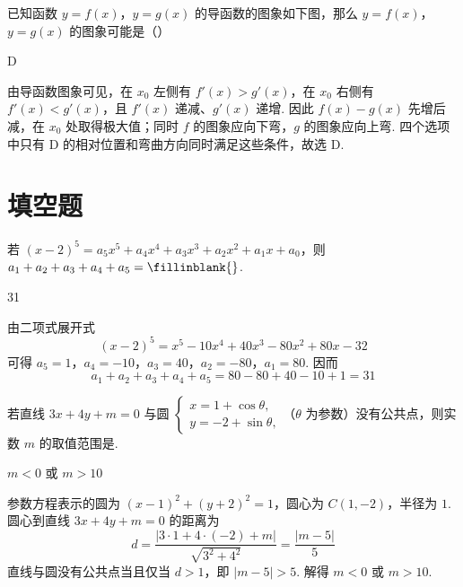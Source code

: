\begin{problem}
已知函数 \( y = f(x) \)，\( y = g(x) \) 的导函数的图象如下图，那么 \( y = f(x) \)，\( y = g(x) \) 的图象可能是（\quad）


    {}
    {}
    {}
\begin{answer}
D
\end{answer}
\begin{solution}
由导函数图象可见，在 \(x_0\) 左侧有 \(f'(x)>g'(x)\)，在 \(x_0\) 右侧有 \(f'(x)<g'(x)\)，且 \(f'(x)\) 递减、\(g'(x)\) 递增. 因此 \(f(x)-g(x)\) 先增后减，在 \(x_0\) 处取得极大值；同时 \(f\) 的图象应向下弯，\(g\) 的图象应向上弯. 四个选项中只有 D 的相对位置和弯曲方向同时满足这些条件，故选 D.
\end{solution}
\end{problem}

\section{填空题}

\begin{problem}
若 \((x - 2)^{5} = a_{5}x^{5} + a_{4}x^{4} + a_{3}x^{3} + a_{2}x^{2} + a_{1}x + a_{0}\)，则 \(a_1 + a_2 + a_3 + a_4 + a_5 =\fillinblank{}\).
\begin{answer}
31
\end{answer}
\begin{solution}
由二项式展开式
\[
(x-2)^5=x^5-10x^4+40x^3-80x^2+80x-32
\]
可得 \(a_5=1\)，\(a_4=-10\)，\(a_3=40\)，\(a_2=-80\)，\(a_1=80\). 因而
\[
a_1+a_2+a_3+a_4+a_5=80-80+40-10+1=31
\]
\end{solution}
\end{problem}

\begin{problem}
若直线 \(3x + 4y + m = 0\) 与圆 \(\begin{cases}
x = 1 + \cos \theta,\\
y = -2 + \sin \theta,
\end{cases}\)（\(\theta\) 为参数）没有公共点，则实数 \(m\) 的取值范围是\fillinblank{}.
\begin{answer}
\(m<0\) 或 \(m>10\)
\end{answer}
\begin{solution}
参数方程表示的圆为 \((x-1)^2+(y+2)^2=1\)，圆心为 \(C(1,-2)\)，半径为 \(1\). 圆心到直线 \(3x+4y+m=0\) 的距离为
\[
d=\frac{|3\cdot1+4\cdot(-2)+m|}{\sqrt{3^2+4^2}}=\frac{|m-5|}{5}
\]
直线与圆没有公共点当且仅当 \(d>1\)，即 \(|m-5|>5\). 解得 \(m<0\) 或 \(m>10\).
\end{solution}
\end{problem}

